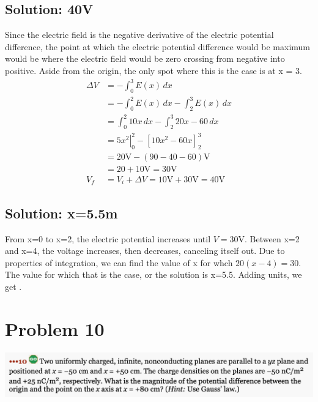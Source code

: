 \documentclass[12pt]{article}
\begin{document}
\subsection{Solution: 40V}
Since the electric field is the negative derivative of the electric potential difference, the point at which the electric potential difference would be maximum would be where the electric field would be zero crossing from negative into positive. 
Aside from the origin, the only spot where this is the case is at x = 3.
\begin{align*}
    \Delta V &= -\int_{0}^{3} E(x)\,dx\\
        &=  -\int_{0}^{2} E(x)\,dx - \int_{2}^{3} E(x)\,dx\\
        &=  \int_{0}^{2} 10x\,dx - \int_{2}^{3} 20x - 60\,dx\\
        &=  \left. 5x^2 \right|_0^2 - \left[ 10x^2 - 60x \right]_2^3\\
        &=  20 \unit{\volt} - (90 - 40 - 60) \unit{\volt}\\
        &=  20 + 10 \unit{\volt}
        =   30 \unit{\volt}\\
        V_f &=  V_i + \Delta V
        =   10 \unit{\volt} + 30 \unit{\volt}
        =   \boxed{40 \unit{\volt}}
\end{align*}

\subsection{Solution: x=5.5m}
From x=0 to x=2, the electric potential increases until $V = 30\unit\volt$. 
Between x=2 and x=4, the voltage increases, then decreases, canceling itself out. 
Due to properties of integration, we can find the value of x for whch $20(x - 4) = 30$. 
The value for which that is the case, or the solution is x=5.5.
Adding units, we get .  
\pagebreak

\section{Problem 10}
\includegraphics[width=\textwidth]{picture_8.png}
\end{document}
